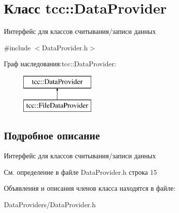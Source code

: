 \hypertarget{classtcc_1_1_data_provider}{}\section{Класс tcc\+:\+:Data\+Provider}
\label{classtcc_1_1_data_provider}


Интерфейс для классов считывания/записи данных  




{\ttfamily \#include $<$Data\+Provider.\+h$>$}

Граф наследования\+:tcc\+:\+:Data\+Provider\+:\begin{figure}[H]
\begin{center}
\leavevmode
\includegraphics[height=2.000000cm]{classtcc_1_1_data_provider}
\end{center}
\end{figure}


\subsection{Подробное описание}
Интерфейс для классов считывания/записи данных 

См. определение в файле Data\+Provider.\+h строка 15



Объявления и описания членов класса находятся в файле\+:\begin{DoxyCompactItemize}
\item 
Data\+Providers/Data\+Provider.\+h\end{DoxyCompactItemize}
